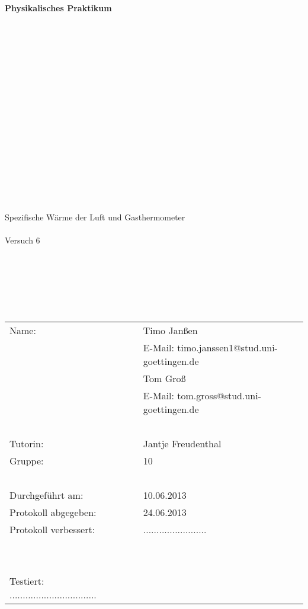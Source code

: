 \thispagestyle{empty}
\begin{center}
    {\Huge{\textbf{Physikalisches Praktikum}}}\\[16pt]
\ \\
\ \\
\ \\
\ \\
\ \\
\ \\
\ \\
\ \\
\ \\
\ \\
\ \\
\ \\
\ \\
\ \\
\ \\
\ \\
\ \\
\huge{Spezifische Wärme der Luft und Gasthermometer}
\ \\
\ \\
\large{Versuch 6}
\end{center}

\normalsize
\ \\
\ \\
\ \\
\ \\
\ \\

\begin{center}
\begin{tabular}{lcl}
      Name: & ~ & Timo Janßen \\
                    & ~ & E-Mail: timo.janssen1@stud.uni-goettingen.de \\
	  		& ~ & Tom Groß \\
		    		& ~ & E-Mail: tom.gross@stud.uni-goettingen.de \\
\ \\		    
      Tutorin: & ~ & Jantje Freudenthal \\
      Gruppe: & ~ & 10 \\
\ \\      
      Durchgeführt am: & ~ & 10.06.2013 \\
      Protokoll abgegeben: & ~ & 24.06.2013 \\
      Protokoll verbessert: & ~ & ........................\\
\ \\
\ \\
      Testiert: .................................    
\end{tabular}\\
\end{center}
